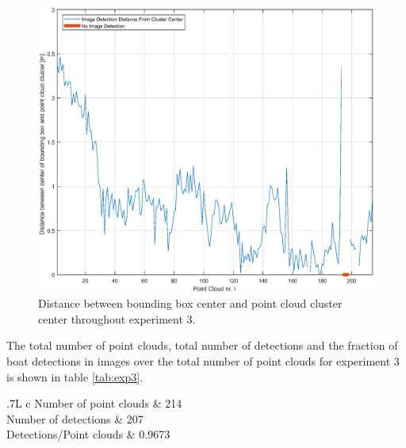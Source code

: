 \begin{figure}[H]
	\centering
	\includegraphics[width=.7\linewidth]{fig/exp_3_dist_pr_pc.eps}
	\caption{Distance between bounding box center and point cloud cluster center throughout experiment 3.}
	\label{fig:ex3_pc_dist}
\end{figure}
The total number of point clouds, total number of detections and the fraction of boat detections in images over the total number of point clouds for experiment 3 is shown in table \ref{tab:exp3}.
\begin{table}[H]
	\centering
	\begin{tabularx}{.7\linewidth}{L c}
		\toprule
		Number of point clouds & 214\\
		\midrule
		Number of detections & 207\\
		\midrule
		Detections/Point clouds & 0.9673 \\
		\bottomrule
	\end{tabularx}
	\caption{Data from experiment 3.}
	\label{tab:exp3}
\end{table}
